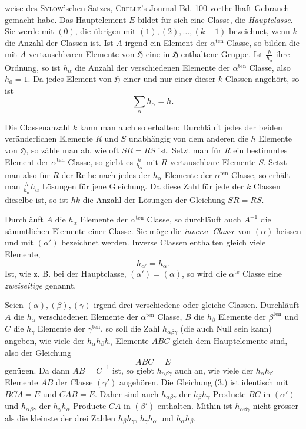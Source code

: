 \documentclass[11pt]{article}
\newcommand{\grp}{\mathfrak{H}}
\begin{document}
weise des \textsc{Sylow}'schen Satzes, \textsc{Crelle}'s Journal Bd. 100 vortheilhaft Gebrauch gemacht habe. Das Hauptelement $E$ bildet für sich eine Classe, die \emph{Hauptclasse}. Sie werde mit $(0)$, die übrigen mit $(1),(2),\ldots,(k-1)$ bezeichnet, wenn $k$ die Anzahl der Classen ist. Ist $A$ irgend ein Element der $\alpha^{\mathrm{ten}}$ Classe, so bilden die mit $A$ vertauschbaren Elemente von $\grp$ eine in $\grp$ enthaltene Gruppe. Ist $\frac{h}{h_\alpha}$ ihre Ordnung, so ist $h_\alpha$ die Anzahl der verschiedenen Elemente der $\alpha^{\mathrm{ten}}$ Classe, also $h_0=1$. Da jedes Element von $\grp$ einer und nur einer dieser $k$ Classen angehört, so ist
\begin{equation*}\tag{1.}
\sum_\alpha h_\alpha=h.
\end{equation*}

Die Classenanzahl $k$ kann man auch so erhalten: Durchläuft jedes der beiden veränderlichen Elemente $R$ und $S$ unabhängig von dem anderen die $h$ Elemente von $\grp$, so zähle man ab, wie oft $SR=RS$ ist. Setzt man für $R$ ein bestimmtes Element der $\alpha^{\mathrm{ten}}$ Classe, so giebt es $\frac{h}{h_\alpha}$ mit $R$ vertauschbare Elemente $S$. Setzt man also für $R$ der Reihe nach jedes der $h_\alpha$ Elemente der $\alpha^{\mathrm{ten}}$ Classe, so erhält man $\frac{h}{h_\alpha}h_\alpha$ Lösungen für jene Gleichung. Da diese Zahl für jede der $k$ Classen dieselbe ist, so ist $hk$ die Anzahl der Lösungen der Gleichung $SR=RS$.

Durchläuft $A$ die $h_\alpha$ Elemente der $\alpha^{\mathrm{ten}}$ Classe, so durchläuft auch $A^{-1}$ die sämmtlichen Elemente einer Classe. Sie möge die \emph{inverse Classe} von $(\alpha)$ heissen und mit $(\alpha')$ bezeichnet werden. Inverse Classen enthalten gleich viele Elemente,
\begin{equation*}\tag{2.}
h_{\alpha'}=h_\alpha.
\end{equation*}
Ist, wie z. B. bei der Hauptclasse, $(\alpha')=(\alpha)$, so wird die $\alpha^{\mathrm{te}}$ Classe eine \emph{zweiseitige} genannt.

Seien $(\alpha),(\beta),(\gamma)$ irgend drei verschiedene oder gleiche Classen. Durchläuft $A$ die $h_\alpha$ verschiedenen Elemente der $\alpha^{\mathrm{ten}}$ Classe, $B$ die $h_\beta$ Elemente der $\beta^{\mathrm{ten}}$ und $C$ die $h_\gamma$ Elemente der $\gamma^{\mathrm{ten}}$, so soll die Zahl $h_{\alpha\beta\gamma}$ (die auch Null sein kann) angeben, wie viele der $h_\alpha h_\beta h_\gamma$ Elemente $ABC$ gleich dem Hauptelemente sind, also der Gleichung
\begin{equation*}\tag{3.}
ABC=E
\end{equation*}
genügen. Da dann $AB=C^{-1}$ ist, so giebt $h_{\alpha\beta\gamma}$ auch an, wie viele der $h_\alpha h_\beta$ Elemente $AB$ der Classe $(\gamma')$ angehören. Die Gleichung (3.) ist identisch mit $BCA=E$ und $CAB=E$. Daher sind auch $h_{\alpha\beta\gamma}$ der $h_\beta h_\gamma$ Producte $BC$ in $(\alpha')$ und $h_{\alpha\beta\gamma}$ der $h_\gamma h_\alpha$ Producte $CA$ in $(\beta')$ enthalten. Mithin ist $h_{\alpha\beta\gamma}$ nicht grösser als die kleinste der drei Zahlen $h_\beta h_\gamma$, $h_\gamma h_\alpha$ und $h_\alpha h_\beta$.
\end{document}
